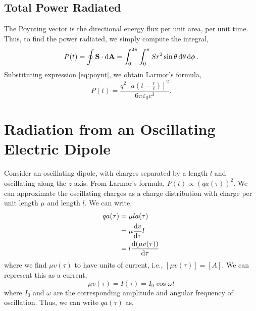 \documentclass{book}
\begin{document}
\subsection{Total Power Radiated}
The Poynting vector is the directional energy flux per unit area, per unit time. Thus, to find the power radiated, we simply compute the integral,
\begin{equation}
	P(t) = \oint \vb{S}\cdot\dd{\vb{A}} = \int_0^{2\pi}\int_0^{\pi} S r^2\sin\theta \dd{\theta} \dd{\phi}.
\end{equation}
Substituting expression \eqref{eq:poynt}, we obtain Larmor's formula,
\begin{equation}
	\boxed{P(t) = \frac{q^2\left[a\left(t-\frac{r}{c}\right)\right]^2}{6\pi \varepsilon_0c^3}}.
\end{equation}
\section{Radiation from an Oscillating Electric Dipole}
\begin{figure}
	\centering
	\caption{}
	\label{fig:dipole}
\end{figure}
Consider an oscillating dipole, with charges separated by a length $l$ and oscillating along the $z$ axis. From Larmor's formula, $P(t) \propto \left(qa(\tau)\right)^2$. We can approximate the oscillating charges as a charge distribution with charge per unit length $\mu$ and length $l$. We can write,
\begin{equation}
	\begin{split}
		qa(\tau) & = \mu la(\tau) \\
		& = \mu \dv{v}{\tau}l \\
		& = l \dv{(\mu v(\tau))}{\tau}
	\end{split}
\end{equation}
where we find $\mu v(\tau)$ to have units of current, i.e., $\left[\mu v(\tau)\right] = [A]$. We can represent this as a current,
\begin{equation}
	\mu v (\tau) =  I(\tau) = I_0\cos\omega t
\end{equation}
where $I_0$ and $\omega$ are the corresponding amplitude and angular frequency of oscillation. Thus, we can write $qa(\tau)$ as,
\end{document}
